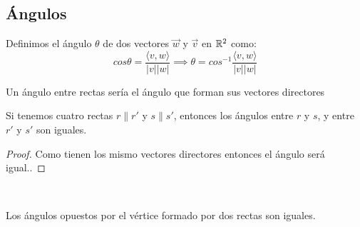 \subsection{Ángulos}

\begin{ndef}
  Definimos el ángulo $\theta$ de dos vectores $\vec{w}$ y $\vec{v}$ en $\mathbb{R}^2$ como:
  \[
    cos \theta =  \frac{\langle  v,w \rangle }{|v||w|} \implies \theta = cos^{-1} \frac{\langle  v,w \rangle }{|v||w|}
  \]
\end{ndef}
\begin{nota}
  Un ángulo entre rectas sería el ángulo que forman sus vectores directores
\end{nota}

\begin{nprop}
  Si tenemos cuatro rectas $r \parallel r'$ y $s \parallel s'$, entonces los ángulos entre $r$ y $s$, y entre $r'$ y $s'$ son iguales.
\end{nprop}

\begin{proof}
	Como tienen los mismo vectores directores entonces el ángulo será igual..
\end{proof}

\begin{nprop}\hfill\\
  \begin{minipage}[c]{0.65\textwidth}
    Los ángulos opuestos por el vértice formado por dos rectas son iguales.
  \end{minipage}\hfill
  \begin{minipage}{0.30\textwidth}

  \end{minipage}
\end{nprop}

